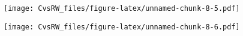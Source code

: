 \documentclass[
]{article}
\newenvironment{Shaded}{\begin{snugshade}}{\end{snugshade}}
\newcommand{\DataTypeTok}[1]{\textcolor[rgb]{0.13,0.29,0.53}{#1}}
\newcommand{\FloatTok}[1]{\textcolor[rgb]{0.00,0.00,0.81}{#1}}
\newcommand{\KeywordTok}[1]{\textcolor[rgb]{0.13,0.29,0.53}{\textbf{#1}}}
\newcommand{\NormalTok}[1]{#1}
\newcommand{\OperatorTok}[1]{\textcolor[rgb]{0.81,0.36,0.00}{\textbf{#1}}}
\newcommand{\StringTok}[1]{\textcolor[rgb]{0.31,0.60,0.02}{#1}}
\begin{document}
\texttt{[image: CvsRW\_files/figure-latex/unnamed-chunk-8-5.pdf]}

\begin{Shaded}
\end{Shaded}

\texttt{[image: CvsRW\_files/figure-latex/unnamed-chunk-8-6.pdf]}

\begin{Shaded}
\end{Shaded}
\end{document}
